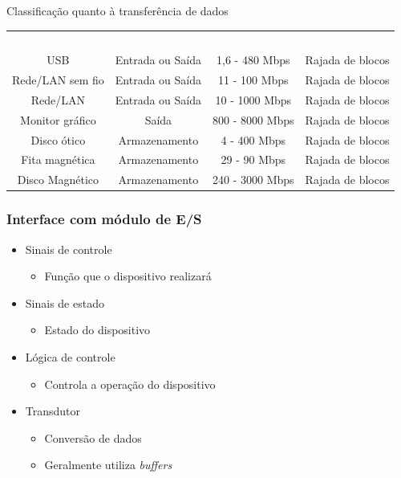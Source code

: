 \documentclass[aspectratio=169,
				xcolor=table]{beamer}
\begin{document}
	\begin{frame}{Classificação quanto à transferência de dados}
	\begin{eftable}
		\begin{tabular}{|c|c|c|c|}
		\textcolor{white}{Dispositivo} & 
		\textcolor{white}{Entrada/Saída} & 
		\textcolor{white}{Taxa de Dados} & 
		\textcolor{white}{Tipo} \\
		USB & Entrada ou Saída & 1,6 - 480 Mbps & Rajada de blocos \\ 
		Rede/LAN sem fio & Entrada ou Saída & 11 - 100 Mbps & Rajada de blocos \\ 
		Rede/LAN & Entrada ou Saída & 10 - 1000 Mbps & Rajada de blocos \\ 
		Monitor gráfico & Saída & 800 - 8000 Mbps & Rajada de blocos \\ 
		Disco ótico & Armazenamento & 4 - 400 Mbps & Rajada de blocos \\ 
		Fita magnética & Armazenamento & 29 - 90 Mbps & Rajada de blocos \\ 
		Disco Magnético & Armazenamento & 240 - 3000 Mbps & Rajada de blocos \\ 
		\end{tabular} 	
	\end{eftable}

	\end{frame}	
	
	\begin{frame}
		\frametitle{Interface com módulo de E/S}
		\begin{itemize}
			\item Sinais de controle
			\begin{itemize}
				\item Função que o dispositivo realizará 
			\end{itemize}
			\vspace{.75em}
			\item Sinais de estado
			\begin{itemize}
				\item Estado do dispositivo 
			\end{itemize}
			\vspace{.75em}
			\item Lógica de controle
			\begin{itemize}
				\item Controla a operação do dispositivo
			\end{itemize}
			\vspace{.75em}
			\item Transdutor
			\begin{itemize}
				\item Conversão de dados
				\item Geralmente utiliza \textit{buffers}
			\end{itemize}
		\end{itemize}
	\end{frame}
\end{document}
